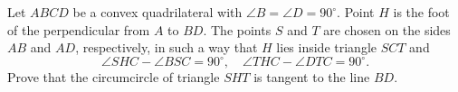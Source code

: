 Let $ABCD$ be a convex quadrilateral with $\angle B = \angle D = 90^{\circ}$. Point $H$ is the foot of the perpendicular from $A$ to $BD$. The points $S$ and $T$ are chosen on the sides $AB$ and $AD$, respectively, in such a way that $H$ lies inside triangle $SCT$ and
\[
\angle SHC - \angle BSC = 90^{\circ}, \quad \angle THC - \angle DTC = 90^{\circ}.
\]
Prove that the circumcircle of triangle $SHT$ is tangent to the line $BD$.
